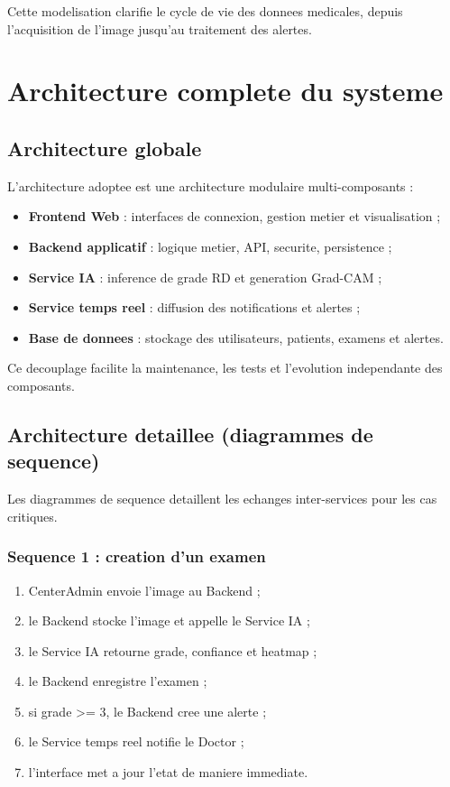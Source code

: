 Cette modelisation clarifie le cycle de vie des donnees medicales, depuis l'acquisition de l'image
jusqu'au traitement des alertes.

\section{Architecture complete du systeme}

\subsection{Architecture globale}
L'architecture adoptee est une architecture modulaire multi-composants :
\begin{itemize}
    \item \textbf{Frontend Web} : interfaces de connexion, gestion metier et visualisation ;
    \item \textbf{Backend applicatif} : logique metier, API, securite, persistence ;
    \item \textbf{Service IA} : inference de grade RD et generation Grad-CAM ;
    \item \textbf{Service temps reel} : diffusion des notifications et alertes ;
    \item \textbf{Base de donnees} : stockage des utilisateurs, patients, examens et alertes.
\end{itemize}

Ce decouplage facilite la maintenance, les tests et l'evolution independante des composants.

\subsection{Architecture detaillee (diagrammes de sequence)}
Les diagrammes de sequence detaillent les echanges inter-services pour les cas critiques.

\subsubsection*{Sequence 1 : creation d'un examen}
\begin{enumerate}
    \item CenterAdmin envoie l'image au Backend ;
    \item le Backend stocke l'image et appelle le Service IA ;
    \item le Service IA retourne grade, confiance et heatmap ;
    \item le Backend enregistre l'examen ;
    \item si grade >= 3, le Backend cree une alerte ;
    \item le Service temps reel notifie le Doctor ;
    \item l'interface met a jour l'etat de maniere immediate.
\end{enumerate}

